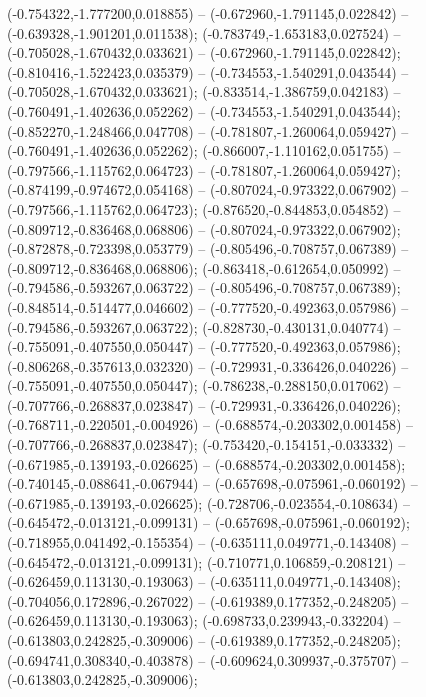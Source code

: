  (-0.754322,-1.777200,0.018855) -- (-0.672960,-1.791145,0.022842) -- (-0.639328,-1.901201,0.011538);
 (-0.783749,-1.653183,0.027524) -- (-0.705028,-1.670432,0.033621) -- (-0.672960,-1.791145,0.022842);
 (-0.810416,-1.522423,0.035379) -- (-0.734553,-1.540291,0.043544) -- (-0.705028,-1.670432,0.033621);
 (-0.833514,-1.386759,0.042183) -- (-0.760491,-1.402636,0.052262) -- (-0.734553,-1.540291,0.043544);
 (-0.852270,-1.248466,0.047708) -- (-0.781807,-1.260064,0.059427) -- (-0.760491,-1.402636,0.052262);
 (-0.866007,-1.110162,0.051755) -- (-0.797566,-1.115762,0.064723) -- (-0.781807,-1.260064,0.059427);
 (-0.874199,-0.974672,0.054168) -- (-0.807024,-0.973322,0.067902) -- (-0.797566,-1.115762,0.064723);
 (-0.876520,-0.844853,0.054852) -- (-0.809712,-0.836468,0.068806) -- (-0.807024,-0.973322,0.067902);
 (-0.872878,-0.723398,0.053779) -- (-0.805496,-0.708757,0.067389) -- (-0.809712,-0.836468,0.068806);
 (-0.863418,-0.612654,0.050992) -- (-0.794586,-0.593267,0.063722) -- (-0.805496,-0.708757,0.067389);
 (-0.848514,-0.514477,0.046602) -- (-0.777520,-0.492363,0.057986) -- (-0.794586,-0.593267,0.063722);
 (-0.828730,-0.430131,0.040774) -- (-0.755091,-0.407550,0.050447) -- (-0.777520,-0.492363,0.057986);
 (-0.806268,-0.357613,0.032320) -- (-0.729931,-0.336426,0.040226) -- (-0.755091,-0.407550,0.050447);
 (-0.786238,-0.288150,0.017062) -- (-0.707766,-0.268837,0.023847) -- (-0.729931,-0.336426,0.040226);
 (-0.768711,-0.220501,-0.004926) -- (-0.688574,-0.203302,0.001458) -- (-0.707766,-0.268837,0.023847);
 (-0.753420,-0.154151,-0.033332) -- (-0.671985,-0.139193,-0.026625) -- (-0.688574,-0.203302,0.001458);
 (-0.740145,-0.088641,-0.067944) -- (-0.657698,-0.075961,-0.060192) -- (-0.671985,-0.139193,-0.026625);
 (-0.728706,-0.023554,-0.108634) -- (-0.645472,-0.013121,-0.099131) -- (-0.657698,-0.075961,-0.060192);
 (-0.718955,0.041492,-0.155354) -- (-0.635111,0.049771,-0.143408) -- (-0.645472,-0.013121,-0.099131);
 (-0.710771,0.106859,-0.208121) -- (-0.626459,0.113130,-0.193063) -- (-0.635111,0.049771,-0.143408);
 (-0.704056,0.172896,-0.267022) -- (-0.619389,0.177352,-0.248205) -- (-0.626459,0.113130,-0.193063);
 (-0.698733,0.239943,-0.332204) -- (-0.613803,0.242825,-0.309006) -- (-0.619389,0.177352,-0.248205);
 (-0.694741,0.308340,-0.403878) -- (-0.609624,0.309937,-0.375707) -- (-0.613803,0.242825,-0.309006);
